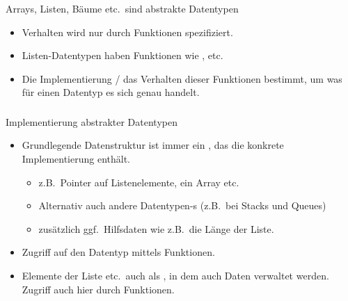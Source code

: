\begin{frame}
\frametitle{\insertsection}
\begin{block}
{Arrays, Listen, Bäume etc.\ sind \alert{abstrakte Datentypen}}
\begin{itemize}
    \item Verhalten wird nur durch Funktionen spezifiziert.
    \item Listen-Datentypen haben Funktionen wie ,  etc.
    \item Die Implementierung / das Verhalten dieser Funktionen bestimmt,
        um was für einen Datentyp es sich genau handelt.
\end{itemize}
\end{block}
\end{frame}

\begin{frame}
\frametitle{\insertsection}
\begin{block}
{Implementierung abstrakter Datentypen}
\begin{itemize}
    \item Grundlegende Datenstruktur ist immer ein ,
        das die konkrete Implementierung enthält.
        \begin{itemize}
            \item z.B.\ Pointer auf Listenelemente, ein Array etc.
            \item Alternativ auch andere Datentypen-s
                (z.B.\ bei Stacks und Queues)
            \item zusätzlich ggf.\ Hilfsdaten wie z.B.\ die Länge der Liste. 
        \end{itemize}
    \item Zugriff auf den Datentyp mittels Funktionen.
    \item Elemente der Liste etc.\ auch als ,
        in dem auch Daten verwaltet werden.
        Zugriff auch hier durch Funktionen.
\end{itemize}
\end{block}
\end{frame}

